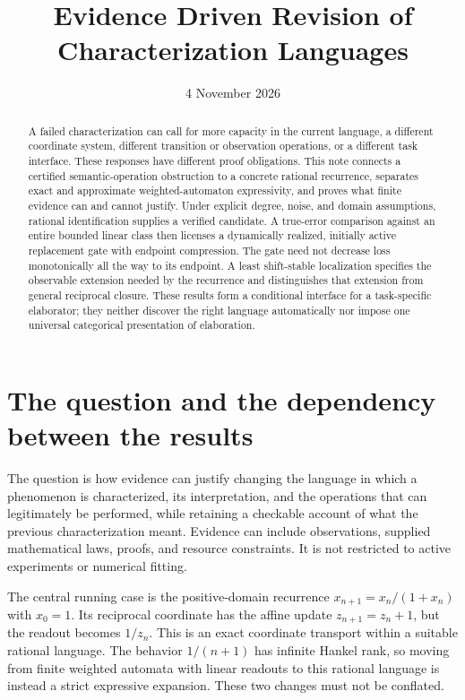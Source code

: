 \documentclass[11pt]{article}
\title{Evidence Driven Revision of Characterization Languages}
\author{}
\date{4 November 2026}
\theoremstyle{definition}
\begin{document}
\maketitle

\begin{abstract}
A failed characterization can call for more capacity in the current language,
a different coordinate system, different transition or observation operations,
or a different task interface. These responses have different proof obligations.
This note connects a certified semantic-operation obstruction to a concrete
rational recurrence, separates exact and approximate weighted-automaton
expressivity, and proves what finite evidence can and cannot justify.
Under explicit degree, noise, and domain assumptions, rational identification
supplies a verified candidate. A true-error comparison against an entire
bounded linear class then licenses a dynamically realized, initially active
replacement gate with endpoint compression. The gate need not decrease loss
monotonically all the way to its endpoint. A least shift-stable localization
specifies the observable extension needed by the recurrence and distinguishes
that extension from general reciprocal closure. These results form a
conditional interface for a task-specific elaborator; they neither discover
the right language automatically nor impose one universal categorical
presentation of elaboration.
\end{abstract}

\section{The question and the dependency between the results}

The question is how evidence can justify changing the language in which a
phenomenon is characterized, its interpretation, and the operations that can
legitimately be performed, while retaining a checkable account of what the
previous characterization meant. Evidence can include observations, supplied
mathematical laws, proofs, and resource constraints. It is not restricted to
active experiments or numerical fitting.

The central running case is the positive-domain recurrence
$x_{n+1}=x_n/(1+x_n)$ with $x_0=1$. Its reciprocal coordinate has the affine
update $z_{n+1}=z_n+1$, but the readout becomes $1/z_n$. This is an exact
coordinate transport within a suitable rational language. The behavior
$1/(n+1)$ has infinite Hankel rank, so moving from finite weighted automata
with linear readouts to this rational language is instead a strict expressive
expansion. These two changes must not be conflated.
\end{document}
